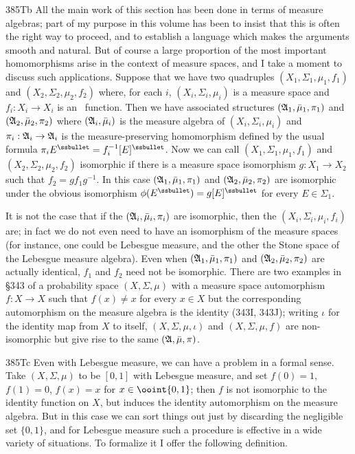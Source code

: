 {\spheader 385Tb All the main work of this section has been done in terms
of measure algebras;  part of my purpose in this volume has been to
insist that this is often the right way to proceed, and to establish a
language which makes the arguments smooth and natural.   But of course a
large proportion of the most important homomorphisms arise in the
context of measure spaces, and I take a moment to discuss such
applications.   Suppose that we have two quadruples
$(X_1,\Sigma_1,\mu_1,f_1)$ and $(X_2,\Sigma_2,\mu_2,f_2)$ where, for each $i$, $(X_i,\Sigma_i,\mu_i)$ is a measure space and $f_i:X_i\to X_i$ is an \imp\ function.   Then we have associated structures
$(\frak A_1,\bar\mu_1,\pi_1)$ and $(\frak A_2,\bar\mu_2,\pi_2)$ where $(\frak A_i,\bar\mu_i)$ is the measure algebra of $(X_i,\Sigma_i,\mu_i)$ and $\pi_i:\frak A_i\to\frak A_i$ is the measure-preserving homomorphism
defined by the usual formula
$\pi_iE^{\ssbullet}=f_i^{-1}[E]^{\ssbullet}$.
Now we can call $(X_1,\Sigma_1,\mu_1,f_1)$ and
$(X_2,\Sigma_2,\mu_2,f_2)$ isomorphic if there is a measure space
isomorphism $g:X_1\to X_2$ such that $f_2=gf_1g^{-1}$.   In this case
$(\frak A_1,\bar\mu_1,\pi_1)$ and $(\frak A_2,\bar\mu_2,\pi_2)$ are
isomorphic under the obvious isomorphism
$\phi(E^{\ssbullet})=g[E]^{\ssbullet}$ for every $E\in\Sigma_1$.
     
It is not the case that if the $(\frak A_i,\bar\mu_i,\pi_i)$ are
isomorphic, then the $(X_i,\Sigma_i,\mu_i,f_i)$ are;  in fact we do not
even need to have an isomorphism of the measure spaces (for instance,
one could be Lebesgue measure, and the other the Stone space of the
Lebesgue measure algebra).   Even when $(\frak A_1,\bar\mu_1,\pi_1)$ and
$(\frak A_2,\bar\mu_2,\pi_2)$ are actually identical, $f_1$ and $f_2$
need not be isomorphic.   There are two examples in \S343 of a
probability space $(X,\Sigma,\mu)$ with a measure space automorphism
$f:X\to X$ such that $f(x)\ne x$ for every $x\in X$ but the
corresponding automorphism on the measure algebra is the identity
(343I, 343J);  writing $\iota$ for the identity map from $X$ to itself,
$(X,\Sigma,\mu,\iota)$ and $(X,\Sigma,\mu,f)$ are non-isomorphic but give 
rise to the same $(\frak A,\bar\mu,\pi)$.
     
\spheader 385Tc Even with Lebesgue measure, we can have a problem in a
formal sense.   Take $(X,\Sigma,\mu)$ to be $[0,1]$ with Lebesgue
measure, and set $f(0)=1$, $f(1)=0$, $f(x)=x$ for $x\in\ooint{0,1}$;
then $f$ is not isomorphic to the identity function on $X$, but induces
the identity automorphism on the measure algebra.   But in this case we
can sort things out just by discarding the negligible set $\{0,1\}$, and
for Lebesgue measure such a procedure is effective in a wide variety of
situations.   To formalize it I offer the following definition.
}%
     
